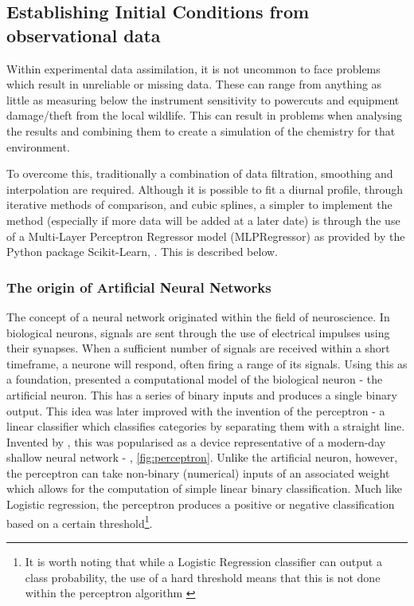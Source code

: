 \subsection{Establishing Initial Conditions from observational data}
Within experimental data assimilation, it is not uncommon to face problems which result in unreliable or missing data. These can range from anything as little as measuring below the instrument sensitivity to powercuts and equipment damage/theft from the local wildlife. This can result in problems when analysing the results and combining them to create a simulation of the chemistry for that environment. 

To overcome this, traditionally a combination of data filtration, smoothing and interpolation are required. Although it is possible to fit a diurnal profile, through iterative methods of comparison, and cubic splines, a simpler to implement the method (especially if more data will be added at a later date) is through the use of a Multi-Layer Perceptron Regressor model (MLPRegressor) as provided by the Python package Scikit-Learn, \citep{sklearn}. This is described below.

\subsubsection{The origin of Artificial Neural Networks}
The concept of a neural network originated within the field of neuroscience. In biological neurons, signals are sent through the use of electrical impulses using their synapses. When a sufficient number of signals are received within a short timeframe, a neurone will respond, often firing a range of its signals. Using this as a foundation, \cite{pitts} presented a computational model of the biological neuron - the artificial neuron. This has a series of binary inputs and produces a single binary output. This idea was later improved with the invention of the perceptron - a linear classifier which classifies categories by separating them with a straight line. Invented by \cite{perceptron}, this was popularised as a device representative of a modern-day shallow neural network - \citep{perceptronmanual}, \autoref{fig:perceptron}. Unlike the artificial neuron, however, the perceptron can take non-binary (numerical) inputs of an associated weight which allows for the computation of simple linear binary classification. Much like Logistic regression, the perceptron produces a positive or negative classification based on a certain threshold\footnote{It is worth noting that while a Logistic Regression classifier can output a class probability, the use of a hard threshold means that this is not done within the perceptron algorithm \citep{handsonml}}. 


